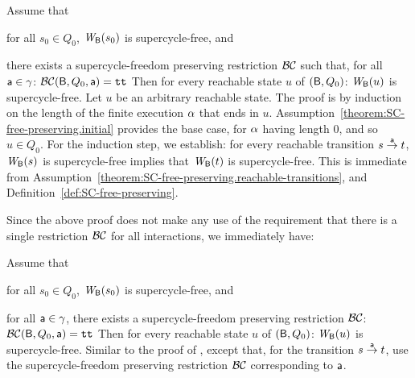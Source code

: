 \label{theorem:SC-free-preserving.deadlock-free}
\label{thm:SC-free-preserving.deadlock-free}
Assume that
\bn
\item \label{theorem:SC-free-preserving.initial}
      for all $s_0 \in Q_0$, $\mathit{W}_{\mathsf{B}}({s_0})$ is supercycle-free, and
\item \label{theorem:SC-free-preserving.reachable-transitions}
   there exists a supercycle-freedom preserving restriction $\mathcal{BC}$ such that,
   for all $\mathsf{a} \in \gamma$: $\mathcal{BC}(\mathsf{B}, Q_0, \mathsf{a}) = \textup{\texttt{tt}}$ 
\en
Then for every reachable state $u$ of $(\mathsf{B}, Q_0)$:  $\mathit{W}_{\mathsf{B}}({u})$ is supercycle-free.
\et
%
\bpr Let $u$ be an arbitrary reachable state. The proof is by induction on the length of the finite
execution $\alpha$ that ends in $u$.  Assumption~\ref{theorem:SC-free-preserving.initial} provides the
base case, for $\alpha$ having length 0, and so $u \in Q_0$.  For the induction step, we establish: for
every reachable transition $s \stackrel{\mathsf{a}}{\rightarrow} t$, $\mathit{W}_{\mathsf{B}}({s})$ is supercycle-free implies that
$\mathit{W}_{\mathsf{B}}({t})$ is supercycle-free. This is immediate from
Assumption~\ref{theorem:SC-free-preserving.reachable-transitions}, and
Definition~\ref{def:SC-free-preserving}.  \epr

Since the above proof does not make any use of the requirement that there is a single restriction
$\mathcal{BC}$ for all interactions, we immediately have:



\label{cor:SC-free-preserving.deadlock-free}
Assume that
\bn
\item \label{cor:SC-free-preserving.initial}
      for all $s_0 \in Q_0$, $\mathit{W}_{\mathsf{B}}({s_0})$ is supercycle-free, and
\item \label{cor:SC-free-preserving.reachable-transitions}
   for all $\mathsf{a} \in \gamma$, there exists a supercycle-freedom preserving restriction $\mathcal{BC}$: $\mathcal{BC}(\mathsf{B}, Q_0, \mathsf{a}) = \textup{\texttt{tt}}$ 
\en
Then for every reachable state $u$ of $(\mathsf{B}, Q_0)$:  $\mathit{W}_{\mathsf{B}}({u})$ is supercycle-free.
\eco
%
\bpr
Similar to the proof of ,  except that, for
the transition $s \stackrel{\mathsf{a}}{\rightarrow} t$, use the  supercycle-freedom preserving restriction $\mathcal{BC}$
corresponding to $\mathsf{a}$.
\epr




